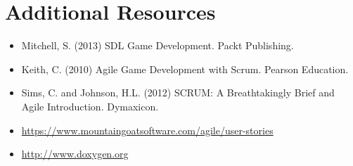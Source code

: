 \documentclass{../fal_assignment}
\begin{document}
\section*{Additional Resources}

\begin{itemize}
    \item Mitchell, S. (2013) SDL Game Development. Packt Publishing.
    \item Keith, C. (2010) Agile Game Development with Scrum. Pearson Education.
    \item Sims, C. and Johnson, H.L. (2012) SCRUM: A Breathtakingly Brief and Agile Introduction. Dymaxicon.
    \item \url{https://www.mountaingoatsoftware.com/agile/user-stories}
    \item \url{http://www.doxygen.org}
\end{itemize}
\end{document}
